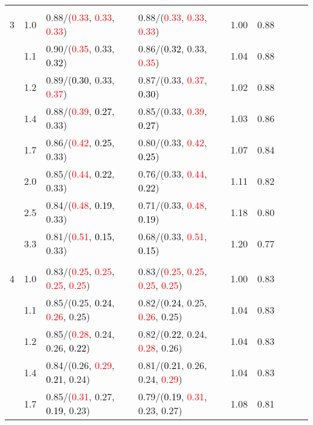 \documentclass[10pt,a4paper]{report}
\begin{document}
\begin{table}[!htbp]
\begin{center}
{\begin{tabular}{ccllccccc}
			&&&&\\
			3			&1.0&0.88/(\textcolor{red}{0.33}, \textcolor{red}{0.33}, \textcolor{red}{0.33})&0.88/(\textcolor{red}{0.33}, \textcolor{red}{0.33}, \textcolor{red}{0.33})&1.00&0.88\\
			&1.1&0.90/(\textcolor{red}{0.35}, 0.33, \textcolor{black}{0.32})&0.86/(\textcolor{black}{0.32}, 0.33, \textcolor{red}{0.35})&1.04&0.88\\
			&1.2&0.89/(\textcolor{black}{0.30}, 0.33, \textcolor{red}{0.37})&0.87/(0.33, \textcolor{red}{0.37}, \textcolor{black}{0.30})&1.02&0.88\\
			&1.4&0.88/(\textcolor{red}{0.39}, \textcolor{black}{0.27}, 0.33)&0.85/(0.33, \textcolor{red}{0.39}, \textcolor{black}{0.27})&1.03&0.86\\
			&1.7&0.86/(\textcolor{red}{0.42}, \textcolor{black}{0.25}, 0.33)&0.80/(0.33, \textcolor{red}{0.42}, \textcolor{black}{0.25})&1.07&0.84\\
			&2.0&0.85/(\textcolor{red}{0.44}, \textcolor{black}{0.22}, 0.33)&0.76/(0.33, \textcolor{red}{0.44}, \textcolor{black}{0.22})&1.11&0.82\\
			&2.5&0.84/(\textcolor{red}{0.48}, \textcolor{black}{0.19}, 0.33)&0.71/(0.33, \textcolor{red}{0.48}, \textcolor{black}{0.19})&1.18&0.80\\
			&3.3&0.81/(\textcolor{red}{0.51}, \textcolor{black}{0.15}, 0.33)&0.68/(0.33, \textcolor{red}{0.51}, \textcolor{black}{0.15})&1.20&0.77\\
			&&&&\\
			4			&1.0&0.83/(\textcolor{red}{0.25}, \textcolor{red}{0.25}, \textcolor{red}{0.25}, \textcolor{red}{0.25})&0.83/(\textcolor{red}{0.25}, \textcolor{red}{0.25}, \textcolor{red}{0.25}, \textcolor{red}{0.25})&1.00&0.83\\
			&1.1&0.85/(0.25, \textcolor{black}{0.24}, \textcolor{red}{0.26}, 0.25)&0.82/(\textcolor{black}{0.24}, 0.25, \textcolor{red}{0.26}, 0.25)&1.04&0.83\\
			&1.2&0.85/(\textcolor{red}{0.28}, 0.24, 0.26, \textcolor{black}{0.22})&0.82/(\textcolor{black}{0.22}, 0.24, \textcolor{red}{0.28}, 0.26)&1.04&0.83\\
			&1.4&0.84/(0.26, \textcolor{red}{0.29}, \textcolor{black}{0.21}, 0.24)&0.81/(\textcolor{black}{0.21}, 0.26, 0.24, \textcolor{red}{0.29})&1.04&0.83\\
			&1.7&0.85/(\textcolor{red}{0.31}, 0.27, \textcolor{black}{0.19}, 0.23)&0.79/(\textcolor{black}{0.19}, \textcolor{red}{0.31}, 0.23, 0.27)&1.08&0.81\\

\end{tabular}}
\end{center}
\end{table}
\end{document}
